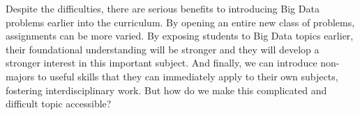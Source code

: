 Despite the difficulties, there are serious benefits to introducing Big Data problems earlier into the curriculum.
By opening an entire new class of problems, assignments can be more varied.
By exposing students to Big Data topics earlier, their foundational understanding will be stronger and they will develop a stronger interest in this important subject.
And finally, we can introduce non-majors to useful skills that they can immediately apply to their own subjects, fostering interdisciplinary work.
But how do we make this complicated and difficult topic accessible?